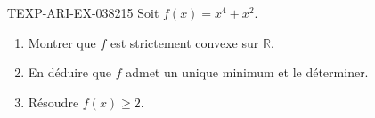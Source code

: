 \begin{exercice}{TEXP-ARI-EX-038}{2}{15}
Soit $f(x) = x^4 + x^2$.
\begin{enumerate}
  \item Montrer que $f$ est strictement convexe sur $\mathbb{R}$.
  \item En déduire que $f$ admet un unique minimum et le déterminer.
  \item Résoudre $f(x) \geq 2$.
\end{enumerate}

\end{exercice}
